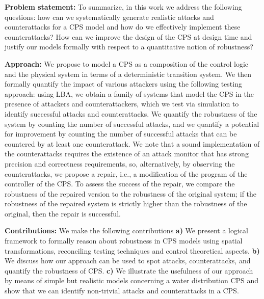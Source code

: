 
% 

\textbf{Problem statement:} To summarize, in this work we address the following
questions: how can we systematically generate realistic attacks and counterattacks for a CPS model and how do we effectively implement these counterattacks? %
How can we improve the design of the CPS at design time and justify our models formally with respect to a quantitative notion of robustness?

\textbf{Approach:} We propose to model a CPS as a composition of the control logic and the physical system in terms of a deterministic transition system. We then formally quantify the impact of various attackers using the following testing approach: using LBA, we obtain a family of systems that model the CPS in the presence of attackers and counterattackers, which we test via simulation to identify successful attacks and counterattacks. We quantify the robustness of the system by counting the number of successful attacks, and we quantify a potential for improvement by counting the number of successful attacks that can be countered by at least one counterattack. We note that a sound implementation of the counterattacks requires the existence of an attack monitor that has strong precision and correctness requirements, so, alternatively, by observing the counterattacks, we propose a repair, i.e., a modification of the program of the controller of the CPS. To assess the success of the repair, we compare the robustness of the repaired version to the robustness of the original system; if the robustness of the repaired system is strictly higher than the robustness of the original, then the repair is successful. 

\textbf{Contributions:} We make the following contributions \textbf{a)} We present a logical framework to formally reason about robustness in CPS models using spatial transformations, 
reconciling testing techniques and control theoretical aspects. \textbf{b)} We discuss how our approach can be used to spot attacks, counterattacks, and quantify the robustness of CPS. \textbf{c)} We illustrate the usefulness of
our approach by means of simple but realistic models concerning a water
distribution CPS and show that we can identify non-trivial attacks and counterattacks 
in a CPS.

